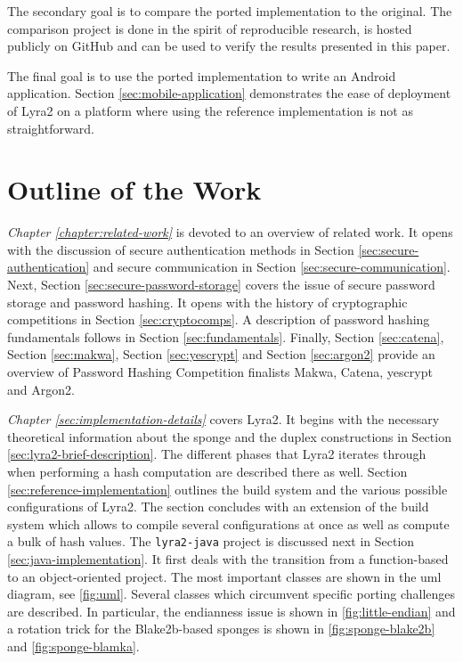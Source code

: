 The secondary goal is to compare the ported implementation to the original. The comparison project is done in the spirit of reproducible research, is hosted publicly on GitHub \cite{github:2017:lyra2-compare} and can be used to verify the results presented in this paper.

The final goal is to use the ported implementation to write an Android application. Section \ref{sec:mobile-application} demonstrates the ease of deployment of Lyra2 on a platform where using the reference implementation is not as straightforward.

\section{Outline of the Work}

\emph{Chapter \ref{chapter:related-work}} is devoted to an overview of related work. It opens with the discussion of secure authentication methods in Section \ref{sec:secure-authentication} and secure communication in Section \ref{sec:secure-communication}. Next, Section \ref{sec:secure-password-storage} covers the issue of secure password storage and password hashing. It opens with the history of cryptographic competitions in Section \ref{sec:cryptocomps}. A description of password hashing fundamentals follows in Section \ref{sec:fundamentals}. Finally, Section \ref{sec:catena}, Section \ref{sec:makwa}, Section \ref{sec:yescrypt} and Section \ref{sec:argon2} provide an overview of Password Hashing Competition finalists Makwa, Catena, yescrypt and Argon2.

\emph{Chapter \ref{sec:implementation-details}} covers Lyra2. It begins with the necessary theoretical information about the sponge and the duplex constructions in Section \ref{sec:lyra2-brief-description}. The different phases that Lyra2 iterates through when performing a hash computation are described there as well. Section \ref{sec:reference-implementation} outlines the build system and the various possible configurations of Lyra2. The section concludes with an extension of the build system which allows to compile several configurations at once as well as compute a bulk of hash values. The \texttt{lyra2-java} project is discussed next in Section \ref{sec:java-implementation}. It first deals with the transition from a function-based to an object-oriented project. The most important classes are shown in the \gls{uml} diagram, see \autoref{fig:uml}. Several classes which circumvent specific porting challenges are described. In particular, the endianness issue is shown in \autoref{fig:little-endian} and a rotation trick for the Blake2b-based sponges is shown in \autoref{fig:sponge-blake2b} and \autoref{fig:sponge-blamka}.

